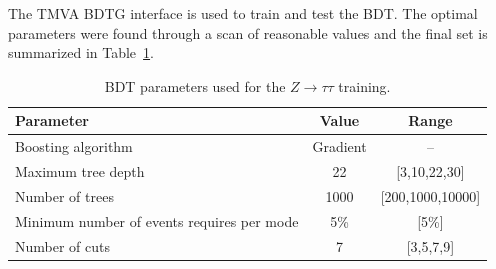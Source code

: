 The TMVA BDTG interface is used to train and test the BDT. The optimal parameters were found through a scan of reasonable values and the final set is summarized in Table~\ref{tab:ZBDTparameters}.
\begin{table}[h!]
\centering
\begin{tabular}{|l|c|c|}
\hline
Parameter                                    & Value    & Range     \\
\hline
Boosting algorithm                           & Gradient & --        \\
Maximum tree depth                           &  22      & [3,10,22,30]    \\
Number of trees                              &  1000    & [200,1000,10000] \\
Minimum number of events requires per mode   &  5\%     & [5\%]\\
Number of cuts                               &  7       & [3,5,7,9]  \\
\hline
\end{tabular}
\caption{BDT parameters used for the $Z\rightarrow\tau\tau$ training.} 
\label{tab:ZBDTparameters}
\end{table}
